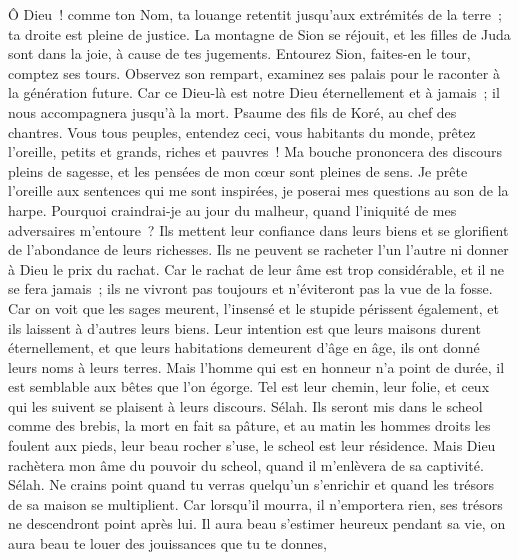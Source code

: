 \begin{multicols}{2}
Ô Dieu~! comme ton Nom, ta louange retentit jusqu'aux extrémités de la terre~; ta droite est pleine de justice.
La montagne de Sion se réjouit, et les filles de Juda sont dans la joie, à cause de tes jugements.
Entourez Sion, faites-en le tour, comptez ses tours.
Observez son rempart, examinez ses palais pour le raconter à la génération future.
Car ce Dieu-là est notre Dieu éternellement et à jamais~; il nous accompagnera jusqu'à la mort.
\VerseOne{}Psaume des fils de Koré, au chef des chantres.
Vous tous peuples, entendez ceci, vous habitants du monde, prêtez l'oreille,
petits et grands, riches et pauvres~!
Ma bouche prononcera des discours pleins de sagesse, et les pensées de mon cœur sont pleines de sens.
Je prête l'oreille aux sentences qui me sont inspirées, je poserai mes questions au son de la harpe.
Pourquoi craindrai-je au jour du malheur, quand l'iniquité de mes adversaires m'entoure~?
Ils mettent leur confiance dans leurs biens et se glorifient de l'abondance de leurs richesses.
Ils ne peuvent se racheter l'un l'autre ni donner à Dieu le prix du rachat.
Car le rachat de leur âme est trop considérable, et il ne se fera jamais~;
ils ne vivront pas toujours et n'éviteront pas la vue de la fosse.
Car on voit que les sages meurent, l'insensé et le stupide périssent également, et ils laissent à d'autres leurs biens.
Leur intention est que leurs maisons durent éternellement, et que leurs habitations demeurent d'âge en âge, ils ont donné leurs noms à leurs terres.
Mais l'homme qui est en honneur n'a point de durée, il est semblable aux bêtes que l'on égorge.
Tel est leur chemin, leur folie, et ceux qui les suivent se plaisent à leurs discours. Sélah.
Ils seront mis dans le scheol comme des brebis, la mort en fait sa pâture, et au matin les hommes droits les foulent aux pieds, leur beau rocher s'use, le scheol est leur résidence.
Mais Dieu rachètera mon âme du pouvoir du scheol, quand il m'enlèvera de sa captivité. Sélah.
Ne crains point quand tu verras quelqu'un s'enrichir et quand les trésors de sa maison se multiplient.
Car lorsqu'il mourra, il n'emportera rien, ses trésors ne descendront point après lui.
Il aura beau s'estimer heureux pendant sa vie, on aura beau te louer des jouissances que tu te donnes,

\end{multicols}
